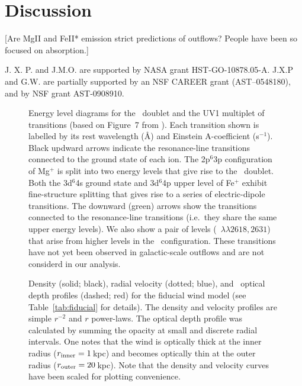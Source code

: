 \documentclass[12pt,preprint]{aastex}
\begin{document}
\section{Discussion}

[Are MgII and FeII* emission strict predictions of outflows?  People
have been so focused on absorption.]

\acknowledgments

J. X. P. and J.M.O. are supported by NASA grant
HST-GO-10878.05-A.  J.X.P and G.W. are partially supported
by an NSF CAREER grant (AST--0548180), and 
by NSF grant AST-0908910.











\begin{figure}
\caption{
Energy level diagrams for the \mgiid\ doublet and the UV1
multiplet of  transitions   
(based on Figure~7 from \cite{hmt+99}).
Each transition shown is
labelled by its rest wavelength (\AA) and Einstein A-coefficient
(s$^{-1}$). Black updward arrows
indicate the resonance-line transitions connected to the ground
state of each ion.  The 2p$^6$3p configuration of Mg$^+$ is split into
two energy levels that give rise to the \mgiid\ doublet.  
Both the 3d$^6$4s ground state and 3d$^6$4p upper level of Fe$^+$
exhibit fine-structure splitting that gives rise to a series of
electric-dipole transitions. 
The downward (green) arrows show the transitions connected to the
resonance-line transitions (i.e.\ they share the same upper energy
levels).  We also show a pair of levels (~$\lambda\lambda
2618,2631$) that arise from higher levels in the \zconfig\
configuration.  These transitions have not yet been observed in
galactic-scale outflows and are not considerd in our analysis.
}
\label{fig:energy}
\end{figure}

\begin{figure}
\caption{
Density (solid; black), radial velocity (dotted; blue), and
\mgiia\ optical depth profiles (dashed; red) for the fiducial
wind model (see Table~\ref{tab:fiducial} for details).
The density and velocity profiles are simple $r^{-2}$ and $r$
power-laws.  The optical depth profile was calculated by summing
the opacity at small and discrete radial intervals.  One notes that
the wind is optically thick at the inner radius ($r_{\rm inner} =
1$\,kpc) and becomes optically thin at the outer radius ($r_{\rm
  outer} = 20$\,kpc).
Note that the density and velocity curves have been scaled for plotting
convenience.  
}
\label{fig:fiducial_nvt}
\end{figure}
\end{document}
